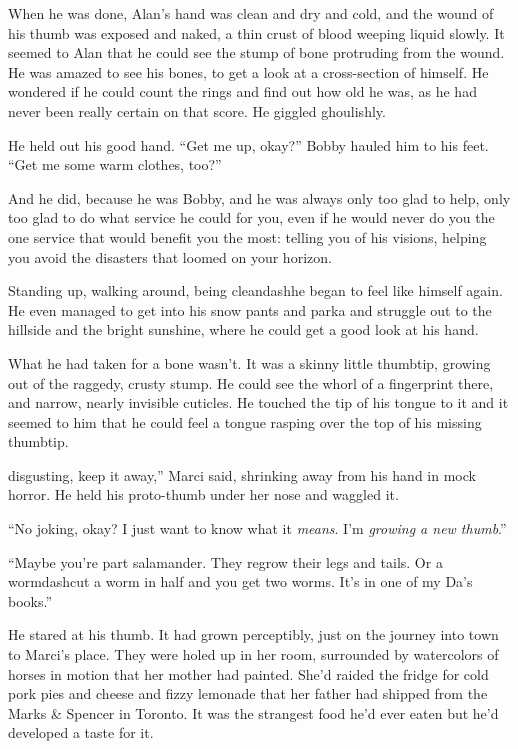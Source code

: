 When he was done, Alan's hand was clean and dry and cold, and the
wound of his thumb was exposed and naked, a thin crust of blood
weeping liquid slowly.  It seemed to Alan that he could see the stump
of bone protruding from the wound.  He was amazed to see his bones, to
get a look at a cross-section of himself.  He wondered if he could
count the rings and find out how old he was, as he had never been
really certain on that score.  He giggled ghoulishly.

He held out his good hand.  ``Get me up, okay?'' Bobby hauled him to
his feet.  ``Get me some warm clothes, too?''

And he did, because he was Bobby, and he was always only too glad to
help, only too glad to do what service he could for you, even if he
would never do you the one service that would benefit you the most: 
telling you of his visions, helping you avoid the disasters that
loomed on your horizon.

Standing up, walking around, being cleandash{}he began to feel like
himself again.  He even managed to get into his snow pants and parka
and struggle out to the hillside and the bright sunshine, where he
could get a good look at his hand.

What he had taken for a bone wasn't.  It was a skinny little thumbtip,
growing out of the raggedy, crusty stump.  He could see the whorl of a
fingerprint there, and narrow, nearly invisible cuticles.  He touched
the tip of his tongue to it and it seemed to him that he could feel a
tongue rasping over the top of his missing thumbtip.

 disgusting, keep it away,'' Marci said, shrinking away from his
hand in mock horror.  He held his proto-thumb under her nose and
waggled it.

``No joking, okay?  I just want to know what it \textit{means}.  I'm
\textit{growing a new thumb}.''

``Maybe you're part salamander.  They regrow their legs and tails.  Or
a wormdash{}cut a worm in half and you get two worms.  It's in one of my
Da's books.''

He stared at his thumb.  It had grown perceptibly, just on the journey
into town to Marci's place.  They were holed up in her room,
surrounded by watercolors of horses in motion that her mother had
painted.  She'd raided the fridge for cold pork pies and cheese and
fizzy lemonade that her father had shipped from the Marks \&
Spencer in Toronto.  It was the strangest food he'd ever eaten but
he'd developed a taste for it.

